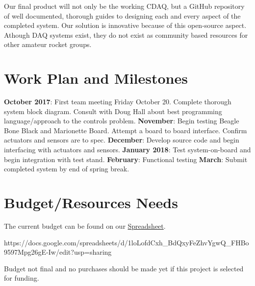 \documentclass{article}
\begin{document}
Our final product will not only be the working CDAQ, but a GitHub repository of well documented, thorough guides to designing each and every aspect of the completed system. Our solution is innovative because of this open-source aspect. Athough DAQ systems exist, they do not exist as community based resources for other amateur rocket groups.
\section{Work Plan and Milestones}

\textbf{October 2017}: First team meeting Friday October 20. Complete thorough system block diagram. Consult with Doug Hall about best programming language/approach to the controls problem. 
\textbf{November}: Begin testing Beagle Bone Black and Marionette Board. Attempt a board to board interface. Confirm actuators and sensors are to spec. 
\textbf{December}: Develop source code and begin interfacing with actuators and sensors. 
\textbf{January 2018}: Test system-on-board and begin integration with test stand. 
\textbf{February}: Functional testing
\textbf{March}: Submit completed system by end of spring break.
\section{Budget/Resources Needs} 
The current budget can be found on our
\href{https://docs.google.com/spreadsheets/d/1loLofdCxh_BdQxyFeZhvYgwQ_FHBo9597Mpg26gE-Iw/edit?usp=sharing}{Spreadsheet}.

https://docs.google.com/spreadsheets/d/1loLofdCxh_BdQxyFeZhvYgwQ_FHBo9597Mpg26gE-Iw/edit?usp=sharing

Budget not final and no purchases should be made yet if this project is selected for funding.
\end{document}
